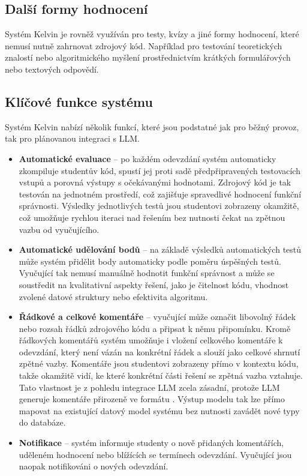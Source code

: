 \subsection{Další formy hodnocení}
\label{subsec:kelvin-other-assessments}

Systém Kelvin je rovněž využíván pro testy, kvízy a jiné formy hodnocení, které nemusí nutně zahrnovat zdrojový kód.
Například pro testování teoretických znalostí nebo algoritmického myšlení prostřednictvím krátkých formulářových nebo textových odpovědí.

\subsection{Klíčové funkce systému}
\label{subsec:kelvin-features}

Systém Kelvin nabízí několik funkcí, které jsou podstatné jak pro běžný provoz, tak pro plánovanou integraci s LLM\@.

\begin{itemize}
    \item \textbf{Automatické evaluace} -- po každém odevzdání systém automaticky zkompiluje studentův kód, spustí jej proti sadě předpřipravených testovacích vstupů a porovná výstupy s očekávanými hodnotami.
    Zdrojový kód je tak testován na jednotném prostředí, což zajišťuje spravedlivé hodnocení funkční správnosti.
    Výsledky jednotlivých testů jsou studentovi zobrazeny okamžitě, což umožňuje rychlou iteraci nad řešením bez nutnosti čekat na zpětnou vazbu od vyučujícího.

    \item \textbf{Automatické udělování bodů} -- na základě výsledků automatických testů může systém přidělit body automaticky podle poměru úspěšných testů.
    Vyučující tak nemusí manuálně hodnotit funkční správnost a může se soustředit na kvalitativní aspekty řešení, jako je čitelnost kódu, vhodnost zvolené datové struktury nebo efektivita algoritmu.

    \item \textbf{Řádkové a celkové komentáře} -- vyučující může označit libovolný řádek nebo rozsah řádků zdrojového kódu a připsat k němu připomínku.
    Kromě řádkových komentářů systém umožňuje i vložení celkového komentáře k odevzdání, který není vázán na konkrétní řádek a slouží jako celkové shrnutí zpětné vazby.
    Komentáře jsou studentovi zobrazeny přímo v kontextu kódu, takže okamžitě vidí, ke které konkrétní části řešení se zpětná vazba vztahuje.
    Tato vlastnost je z pohledu integrace LLM zcela zásadní, protože LLM generuje komentáře přirozeně ve formátu .
    Výstup modelu tak lze přímo mapovat na existující datový model systému bez nutnosti zavádět nové typy do databáze.

    \item \textbf{Notifikace} -- systém informuje studenty o nově přidaných komentářích, uděleném hodnocení nebo blížících se termínech odevzdání.
    Vyučující jsou naopak notifikováni o nových odevzdání.
\end{itemize}

\endinput